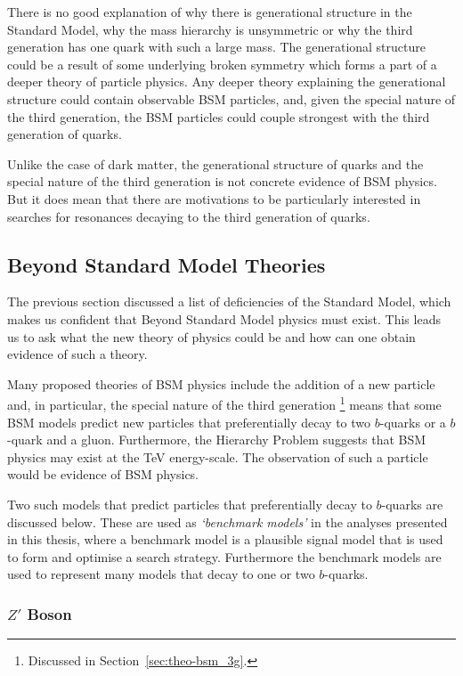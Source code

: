 There is no good explanation of why there is generational structure in the Standard Model,
why the mass hierarchy is unsymmetric 
or why the third generation has one quark with such a large mass.
The generational structure could be a result of some underlying broken symmetry
which forms a part of a deeper theory of particle physics.
Any deeper theory explaining the generational structure could contain observable BSM particles,
and, given the special nature of the third generation,
the BSM particles could couple strongest with the third generation of quarks.

Unlike the case of dark matter,
the generational structure of quarks
and the special nature of the third generation is not concrete evidence of BSM physics.
But it does mean that there are motivations to be particularly interested in
searches for resonances decaying to the third generation of quarks.

\subsection{Beyond Standard Model Theories}
\label{sec:theo-bsm_models}

The previous section discussed a list of deficiencies of the Standard Model,
which makes us confident that Beyond Standard Model physics must exist.
This leads us to ask what the new theory of physics could be and
how can one obtain evidence of such a theory.

Many proposed theories of BSM physics include the addition of a new particle and,
in particular, the special nature of the third generation
\footnote{Discussed in Section~\ref{sec:theo-bsm_3g}.}
means that some BSM models predict new particles
that preferentially decay to two $b$-quarks or a $b$-quark and a gluon.
Furthermore, the Hierarchy Problem suggests that BSM physics may exist at the TeV energy-scale.
The observation of such a particle would be evidence of BSM physics.

Two such models that predict particles that preferentially decay to $b$-quarks are discussed below.
These are used as \textit{`benchmark models'} in the analyses presented in this thesis,
where a benchmark model is a plausible signal model that is used to form and optimise a search strategy.
Furthermore the benchmark models are used to represent many models that decay to one or two $b$-quarks.

\subsubsection{$Z'$ Boson}
\label{sec:theo-bsm_zprime}

